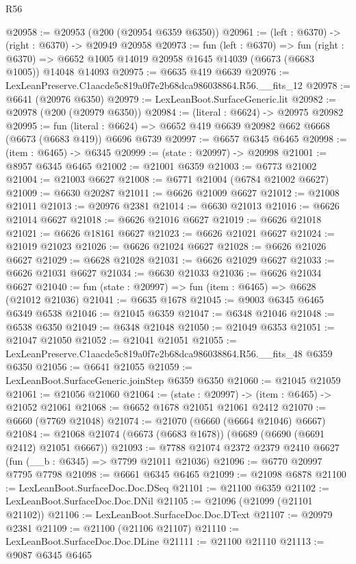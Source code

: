 \begin{lexlean}{R56}
\begin{coremodule}
@20958 := @20953 (@200 (@20954 @6359 @6350))
@20961 := (left : @6370) -> (right : @6370) -> @20949 @20958
@20973 := fun (left : @6370) =>
  fun (right : @6370) => @6652 @1005 @14019 @20958 @1645 @14039 (@6673 (@6683 @1005)) @14048 @14093
@20975 := @6635 @419 @6639
@20976 := LexLeanPreserve.C1aacde5c819a0f7e2b68dca986038864.R56.__fits_12
@20978 := @6641 (@20976 @6350)
@20979 := LexLeanBoot.SurfaceGeneric.lit
@20982 := @20978 (@200 (@20979 @6350))
@20984 := (literal : @6624) -> @20975 @20982
@20995 := fun (literal : @6624) =>
  @6652 @419 @6639 @20982 @662 @6668 (@6673 (@6683 @419)) @6696 @6739
@20997 := @6657 @6345 @6465
@20998 := (item : @6465) -> @6345
@20999 := (state : @20997) -> @20998
@21001 := @8957 @6345 @6465
@21002 := @21001 @6359
@21003 := @6773 @21002
@21004 := @21003 @6627
@21008 := @6771 @21004 (@6784 @21002 @6627)
@21009 := @6630 @20287
@21011 := @6626 @21009 @6627
@21012 := @21008 @21011
@21013 := @20976 @2381
@21014 := @6630 @21013
@21016 := @6626 @21014 @6627
@21018 := @6626 @21016 @6627
@21019 := @6626 @21018
@21021 := @6626 @18161 @6627
@21023 := @6626 @21021 @6627
@21024 := @21019 @21023
@21026 := @6626 @21024 @6627
@21028 := @6626 @21026 @6627
@21029 := @6628 @21028
@21031 := @6626 @21029 @6627
@21033 := @6626 @21031 @6627
@21034 := @6630 @21033
@21036 := @6626 @21034 @6627
@21040 := fun (state : @20997) => fun (item : @6465) => @6628 (@21012 @21036)
@21041 := @6635 @1678
@21045 := @9003 @6345 @6465 @6349 @6538
@21046 := @21045 @6359
@21047 := @6348 @21046
@21048 := @6538 @6350
@21049 := @6348 @21048
@21050 := @21049 @6353
@21051 := @21047 @21050
@21052 := @21041 @21051
@21055 := LexLeanPreserve.C1aacde5c819a0f7e2b68dca986038864.R56.__fits_48 @6359 @6350
@21056 := @6641 @21055
@21059 := LexLeanBoot.SurfaceGeneric.joinStep @6359 @6350
@21060 := @21045 @21059
@21061 := @21056 @21060
@21064 := (state : @20997) -> (item : @6465) -> @21052 @21061
@21068 := @6652 @1678 @21051 @21061 @2412
@21070 := @6660 (@7769 @21048)
@21074 := @21070 (@6660 (@6664 @21046) @6667)
@21084 := @21068 @21074 (@6673 (@6683 @1678)) (@6689 (@6690 (@6691 @2412) @21051 @6667))
@21093 := @7788 @21074 @2372 @2379 @2410 @6627 (fun (__b : @6345) => @7799 @21011 @21036)
@21096 := @6770 @20997 @7795 @7798
@21098 := @6661 @6345 @6465
@21099 := @21098 @6878
@21100 := LexLeanBoot.SurfaceDoc.Doc.DSeq
@21101 := @21100 @6359
@21102 := LexLeanBoot.SurfaceDoc.Doc.DNil
@21105 := @21096 (@21099 (@21101 @21102))
@21106 := LexLeanBoot.SurfaceDoc.Doc.DText
@21107 := @20979 @2381
@21109 := @21100 (@21106 @21107)
@21110 := LexLeanBoot.SurfaceDoc.Doc.DLine
@21111 := @21100 @21110
@21113 := @9087 @6345 @6465

\end{coremodule}
\end{lexlean}
